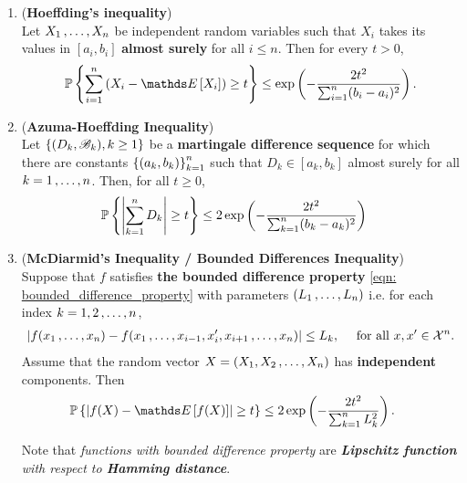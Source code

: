 \documentclass[11pt]{article}
\begin{document}
\begin{itemize}
\begin{remark}
\begin{enumerate}
\item  \begin{theorem} (\textbf{Hoeffding's inequality}) \citep{boucheron2013concentration} \\
Let $X_1 \,{,}\ldots{,}\, X_n$ be independent random variables such that $X_i$ takes its values in $[a_i, b_i]$ \textbf{almost surely} for all $i \le n$. 
Then for every $t > 0$,
\begin{align*}
\bP\set{\sum_{i=1}^{n}\paren{X_i - \E{}{X_i}} \ge  t} \le \exp\paren{- \frac{2t^2}{\sum_{i=1}^{n}(b_i - a_i)^2}}. 
\end{align*}
\end{theorem}

\item \begin{corollary} (\textbf{Azuma-Hoeffding Inequality})\citep{wainwright2019high}\\
Let $\left\{(D_k, {\mathscr B}_k), k \ge 1\right\}$ be a \textbf{martingale difference sequence} for which there are constants $\left\{(a_k, b_k)\right\}^{n}_{k=1}$ such that $D_k \in [a_k, b_k]$ almost surely for all $k = 1 \,{,}\ldots{,}\, n$. Then, for all $t \ge 0$,
\begin{align*}
{\mathbb P}\left\{\left\lvert \sum_{k=1}^{n}D_k \right\rvert \ge t \right\} &\le  2 \exp\left(- \frac{2 t^2}{ \sum_{k=1}^{n}(b_k - a_k)^2}\right)
\end{align*}
\end{corollary}

\item \begin{theorem} (\textbf{McDiarmid's Inequality / Bounded Differences Inequality})\citep{boucheron2013concentration, wainwright2019high}\\
Suppose that $f$ satisfies \textbf{the bounded difference property} \eqref{eqn: bounded_difference_property} with parameters $(L_1 \,{,}\ldots{,}\, L_n)$ i.e. for each index $k = 1, 2 \,{,}\ldots{,}\, n$,
\begin{align*}
\left\lvert f(x_1 \,{,}\ldots{,}\, x_n) - f(x_1 \,{,}\ldots{,}\, x_{i-1},x'_{i}, x_{i+1} \,{,}\ldots{,}\, x_n) \right\rvert \le L_k, \quad\text{ for all }x, x' \in {\mathcal X}^n. 
\end{align*} Assume that the random vector $X = (X_1, X_2 \,{,}\ldots{,}\, X_n)$ has \textbf{independent} components. Then
\begin{align*}
\bP\set{\abs{f(X) - \E{}{f(X)}} \ge t } &\le  2 \exp\paren{- \frac{2 t^2}{ \sum_{k=1}^{n}L_k^2}}. \
\end{align*}
\end{theorem} Note that  \emph{functions with bounded difference property} are \emph{\textbf{Lipschitz function} with respect to \textbf{Hamming distance}}.


\end{enumerate}
\end{remark}
\end{itemize}
\end{document}
